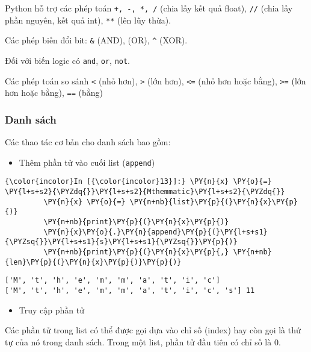     Python hỗ trợ các phép toán \texttt{+,\ -,\ *,\ /} (chia lấy kết quả
float), \texttt{//} (chia lấy phần nguyên, kết quả int), \texttt{**}
(lên lũy thừa).

Các phép biến đổi bit: \texttt{\&} (AND), \texttt{\textbar{}} (OR),
\texttt{\^{}} (XOR).

Đối với biến logic có \texttt{and}, \texttt{or}, \texttt{not}.

Các phép toán so sánh \texttt{\textless{}} (nhỏ hơn),
\texttt{\textgreater{}} (lớn hơn), \texttt{\textless{}=} (nhỏ hơn hoặc
bằng), \texttt{\textgreater{}=} (lớn hơn hoặc bằng), \texttt{==} (bằng)

    \subsubsection{Danh sách}\label{danh-suxe1ch}

    Các thao tác cơ bản cho danh sách bao gồm:

    \begin{itemize}
\tightlist
\item
  Thêm phần tử vào cuối list (\texttt{append})
\end{itemize}

    
\begin{Verbatim}[commandchars=\\\{\}]
{\color{incolor}In [{\color{incolor}13}]:} \PY{n}{x} \PY{o}{=} \PY{l+s+s2}{\PYZdq{}}\PY{l+s+s2}{Mthemmatic}\PY{l+s+s2}{\PYZdq{}}
         \PY{n}{x} \PY{o}{=} \PY{n+nb}{list}\PY{p}{(}\PY{n}{x}\PY{p}{)}
         \PY{n+nb}{print}\PY{p}{(}\PY{n}{x}\PY{p}{)}
         \PY{n}{x}\PY{o}{.}\PY{n}{append}\PY{p}{(}\PY{l+s+s1}{\PYZsq{}}\PY{l+s+s1}{s}\PY{l+s+s1}{\PYZsq{}}\PY{p}{)}
         \PY{n+nb}{print}\PY{p}{(}\PY{n}{x}\PY{p}{,} \PY{n+nb}{len}\PY{p}{(}\PY{n}{x}\PY{p}{)}\PY{p}{)}
\end{Verbatim}
    

    \begin{Verbatim}[commandchars=\\\{\}]
['M', 't', 'h', 'e', 'm', 'm', 'a', 't', 'i', 'c']
['M', 't', 'h', 'e', 'm', 'm', 'a', 't', 'i', 'c', 's'] 11

    \end{Verbatim}

    \begin{itemize}
\tightlist
\item
  Truy cập phần tử
\end{itemize}

Các phần tử trong list có thể được gọi dựa vào chỉ số (index) hay còn
gọi là thứ tự của nó trong danh sách. Trong một list, phần tử đầu tiên
có chỉ số là 0.

